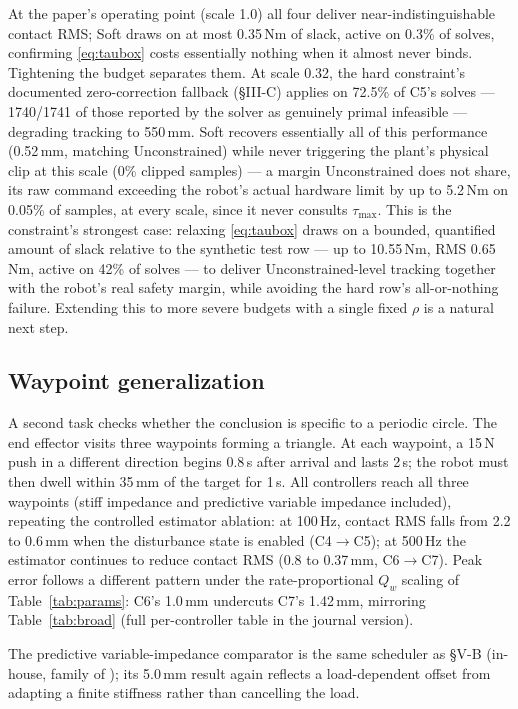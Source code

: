 \documentclass[conference]{IEEEtran}
\begin{document}
At the paper's operating point (scale 1.0) all four deliver
near-indistinguishable contact RMS; Soft draws on at most 0.35\,Nm of
slack, active on 0.3\% of solves, confirming \eqref{eq:taubox} costs
essentially nothing when it almost never binds. Tightening the budget
separates them. At scale 0.32, the hard constraint's documented
zero-correction fallback (\S III-C) applies on 72.5\% of C5's solves ---
1740/1741 of those reported by the solver as genuinely primal infeasible
--- degrading tracking to 550\,mm. Soft recovers essentially all of this
performance (0.52\,mm, matching Unconstrained) while never triggering the
plant's physical clip at this scale (0\% clipped samples) --- a margin
Unconstrained does not share, its raw command exceeding the robot's
actual hardware limit by up to 5.2\,Nm on 0.05\% of samples, at every
scale, since it never consults $\tau_{\max}$. This is the constraint's
strongest case: relaxing \eqref{eq:taubox} draws on a bounded, quantified
amount of slack relative to the synthetic test row --- up to 10.55\,Nm,
RMS 0.65\,Nm, active on 42\% of solves --- to deliver Unconstrained-level
tracking together with the robot's real safety margin, while avoiding the
hard row's all-or-nothing failure. Extending this to more severe budgets
with a single fixed $\rho$ is a natural next step.

\subsection{Waypoint generalization}

A second task checks whether the conclusion is specific to a periodic circle.
The end effector visits three waypoints forming a triangle. At each waypoint,
a 15\,N push in a different direction begins 0.8\,s after arrival and lasts
2\,s; the robot must then dwell within 35\,mm of the target for 1\,s. All
controllers reach all three waypoints (stiff impedance and predictive
variable impedance included), repeating the controlled estimator ablation:
at 100\,Hz, contact RMS falls from 2.2 to 0.6\,mm when the disturbance
state is enabled (C4$\to$C5); at 500\,Hz the estimator continues to reduce
contact RMS (0.8 to 0.37\,mm, C6$\to$C7). Peak error follows a different
pattern under the rate-proportional $Q_w$ scaling of Table~\ref{tab:params}:
C6's 1.0\,mm undercuts C7's 1.42\,mm, mirroring Table~\ref{tab:broad}
(full per-controller table in the journal version).

The predictive variable-impedance comparator is the same
scheduler as \S V-B (in-house, family of \cite{liu2025model,roveda2019optimal});
its 5.0\,mm result again reflects a load-dependent offset from adapting a
finite stiffness rather than cancelling the load.
\end{document}
